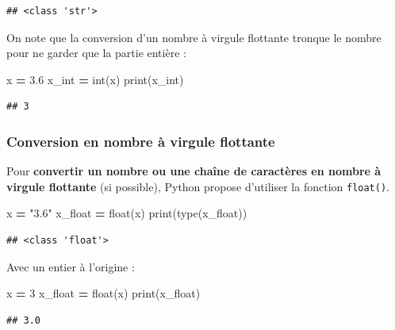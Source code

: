 \documentclass[12pt,]{book}
\newenvironment{Shaded}{\begin{snugshade}}{\end{snugshade}}
\newcommand{\DecValTok}[1]{\textcolor[rgb]{0.00,0.00,0.81}{#1}}
\newcommand{\FloatTok}[1]{\textcolor[rgb]{0.00,0.00,0.81}{#1}}
\newcommand{\StringTok}[1]{\textcolor[rgb]{0.31,0.60,0.02}{#1}}
\newcommand{\OperatorTok}[1]{\textcolor[rgb]{0.81,0.36,0.00}{\textbf{#1}}}
\newcommand{\BuiltInTok}[1]{#1}
\newcommand{\NormalTok}[1]{#1}
\numberwithin{equation}{section}
\numberwithin{countremarque}{section}
\begin{document}
\begin{lstlisting}
## <class 'str'>
\end{lstlisting}

On note que la conversion d'un nombre à virgule flottante tronque le
nombre pour ne garder que la partie entière :

\begin{Shaded}
\begin{Highlighting}[]
\NormalTok{x }\OperatorTok{=} \FloatTok{3.6}
\NormalTok{x_int }\OperatorTok{=} \BuiltInTok{int}\NormalTok{(x)}
\BuiltInTok{print}\NormalTok{(x_int)}
\end{Highlighting}
\end{Shaded}

\begin{lstlisting}
## 3
\end{lstlisting}

\subsubsection{Conversion en nombre à virgule
flottante}\label{conversion-en-nombre-a-virgule-flottante}

Pour \textbf{convertir un nombre ou une chaîne de caractères en nombre à
virgule flottante} (si possible), Python propose d'utiliser la fonction
\texttt{float()}.

\begin{Shaded}
\begin{Highlighting}[]
\NormalTok{x }\OperatorTok{=} \StringTok{"3.6"}
\NormalTok{x_float }\OperatorTok{=} \BuiltInTok{float}\NormalTok{(x)}
\BuiltInTok{print}\NormalTok{(}\BuiltInTok{type}\NormalTok{(x_float))}
\end{Highlighting}
\end{Shaded}

\begin{lstlisting}
## <class 'float'>
\end{lstlisting}

Avec un entier à l'origine :

\begin{Shaded}
\begin{Highlighting}[]
\NormalTok{x }\OperatorTok{=} \DecValTok{3}
\NormalTok{x_float }\OperatorTok{=} \BuiltInTok{float}\NormalTok{(x)}
\BuiltInTok{print}\NormalTok{(x_float)}
\end{Highlighting}
\end{Shaded}

\begin{lstlisting}
## 3.0
\end{lstlisting}
\end{document}

